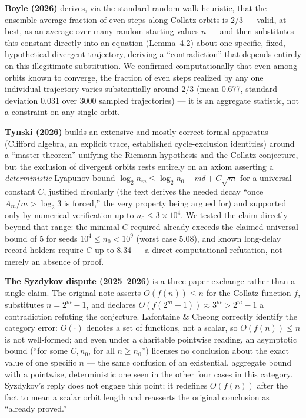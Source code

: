 \documentclass[11pt]{article}
\begin{document}
\textbf{Boyle (2026)} \cite{Boyle2026} derives, via the standard
random-walk heuristic, that the ensemble-average fraction of even steps
along Collatz orbits is \(2/3\) --- valid, at best, as an average over
many random starting values \(n\) --- and then substitutes this
constant directly into an equation (Lemma~4.2) about one specific,
fixed, hypothetical divergent trajectory, deriving a ``contradiction''
that depends entirely on this illegitimate substitution. We confirmed
computationally that even among orbits known to converge, the fraction
of even steps realized by any one individual trajectory varies
substantially around \(2/3\) (mean 0.677, standard deviation 0.031 over
3000 sampled trajectories) --- it is an aggregate statistic, not a
constraint on any single orbit.

\textbf{Tynski (2026)} \cite{Tynski2026} builds an extensive and mostly
correct formal apparatus (Clifford algebra, an explicit trace,
established cycle-exclusion identities) around a ``master theorem''
unifying the Riemann hypothesis and the Collatz conjecture, but the
exclusion of divergent orbits rests entirely on an axiom asserting a
\emph{deterministic} Lyapunov bound
\(\log_2 n_m \le \log_2 n_0 - m\delta + C\sqrt m\) for a universal
constant \(C\), justified circularly (the text derives the needed
decay ``once \(A_m/m > \log_2 3\) is forced,'' the very property being
argued for) and supported only by numerical verification up to
\(n_0 \le 3\times 10^4\). We tested the claim directly beyond that
range: the minimal \(C\) required already exceeds the claimed universal
bound of 5 for seeds \(10^4 \le n_0 < 10^9\) (worst case 5.08), and
known long-delay record-holders require \(C\) up to 8.34 --- a direct
computational refutation, not merely an absence of proof.

\textbf{The Syzdykov dispute (2025--2026)} \cite{Syzdykov2025,Syzdykov2026,LafontaineCheong2026}
is a three-paper exchange rather than a single claim. The original note
\cite{Syzdykov2025} asserts \(O(f(n)) \le n\) for the Collatz function
\(f\), substitutes \(n = 2^m-1\), and declares
\(O(f(2^m-1)) \approx 3^m > 2^m - 1\) a contradiction refuting the
conjecture. Lafontaine \& Cheong \cite{LafontaineCheong2026} correctly
identify the category error: \(O(\cdot)\) denotes a set of functions,
not a scalar, so \(O(f(n)) \le n\) is not well-formed; and even under a
charitable pointwise reading, an asymptotic bound (``for some \(C,n_0\),
for all \(n \ge n_0\)'') licenses no conclusion about the exact value of
one specific \(n\) --- the same confusion of an existential, aggregate
bound with a pointwise, deterministic one seen in the other four cases
in this category. Syzdykov's reply \cite{Syzdykov2026} does not engage
this point; it redefines \(O(f(n))\) after the fact to mean a scalar
orbit length and reasserts the original conclusion as ``already
proved.''
\end{document}
